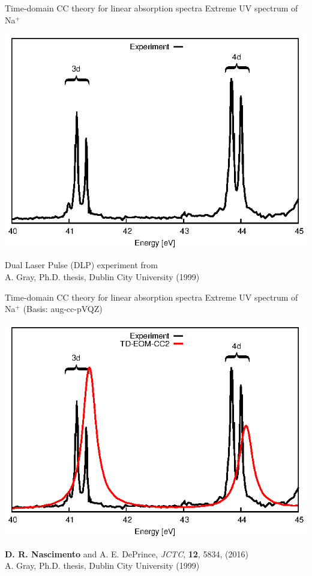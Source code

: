 \documentclass{beamer}
\begin{document}
\begin{frame}{Time-domain CC theory for linear absorption spectra}
 Extreme UV spectrum of Na$^+$

 \begin{center}
       \includegraphics[scale=1.0]{figures/anim_Na_1.eps}
 \end{center}
 \footnotesize{Dual Laser Pulse (DLP) experiment from}\\
 \footnotesize{A. Gray, Ph.D. thesis, Dublin City University (1999)} 
\end{frame}

\begin{frame}{Time-domain CC theory for linear absorption spectra}
 Extreme UV spectrum of Na$^+$ (Basis: aug-cc-pVQZ)
 \begin{center}
      \includegraphics[scale=1.0]{figures/anim_Na_2.eps}
 \end{center}
 \footnotesize{{\bf D. R. Nascimento} and A. E. DePrince, {\it JCTC}, {\bf 12}, 5834, (2016) }\\
 \footnotesize{A. Gray, Ph.D. thesis, Dublin City University (1999)} 
\end{frame}
\end{document}
